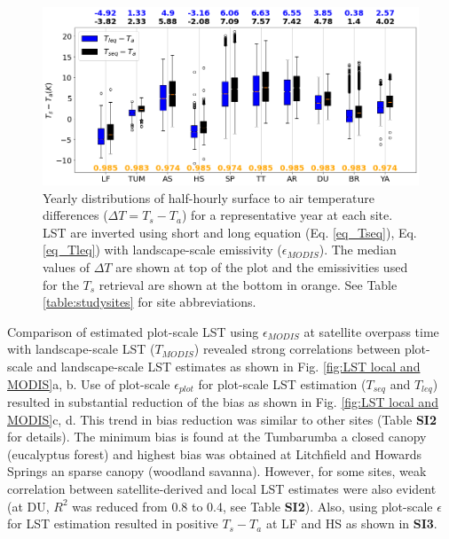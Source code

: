 \documentclass[fleqn,10pt]{wlscirep}
\begin{document}
\begin{figure}[h!]
	\includegraphics[scale=0.35]{Ts_Talocalleqseq.png}
	\centering
    \caption{
     Yearly distributions of half-hourly surface to air temperature differences ($\Delta T = T_s - T_a$) for a representative year at each site.  %
    LST are inverted using short and long equation (Eq. \ref{eq_Tseq}), Eq. \ref{eq_Tleq}) with landscape-scale emissivity ($\epsilon_{MODIS}$).
    The median values of $\Delta T$ are shown at top of the plot and the emissivities used for the $T_{s}$ retrieval are shown at the bottom in orange. See Table \ref{table:studysites} for site abbreviations.}
	\label{fig:long_short_eq_epsilon_MODIS}
\end{figure}
Comparison of estimated plot-scale LST using $\epsilon_{MODIS}$ at satellite overpass time with landscape-scale LST ($T_{MODIS}$) revealed strong correlations between plot-scale and landscape-scale LST estimates as shown in Fig. \ref{fig:LST local and MODIS}a, b. Use  of plot-scale $\epsilon_{plot}$ for plot-scale LST estimation ($T_{seq}$ and $T_{leq}$) resulted in substantial reduction of the bias as shown in Fig. \ref{fig:LST local and MODIS}c, d. This trend in bias reduction was similar to other sites (Table \textbf{SI2} for details). The  minimum bias is found  at the Tumbarumba a closed canopy (eucalyptus forest) and highest bias was obtained at Litchfield and Howards Springs an sparse canopy (woodland savanna). However, for some sites, weak correlation between satellite-derived and local LST estimates were also evident (at DU, $R^2$ was reduced from 0.8 to 0.4, see Table \textbf{SI2}). Also, using plot-scale $\epsilon$ for LST estimation resulted in positive $T_{s} - T_{a}$ at LF and HS as shown in \textbf{SI3}.  
\end{document}
